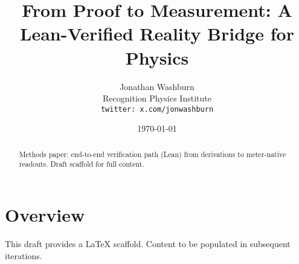 \documentclass[11pt,letterpaper]{article}
\title{From Proof to Measurement: A Lean-Verified Reality Bridge for Physics}
\author{Jonathan Washburn\\Recognition Physics Institute\\\texttt{twitter: x.com/jonwashburn}}
\date{\today}
\begin{document}
\maketitle
\begin{abstract}
Methods paper: end-to-end verification path (Lean) from derivations to meter-native readouts. Draft scaffold for full content.
\end{abstract}
\section{Overview}
This draft provides a LaTeX scaffold. Content to be populated in subsequent iterations.
\end{document}
